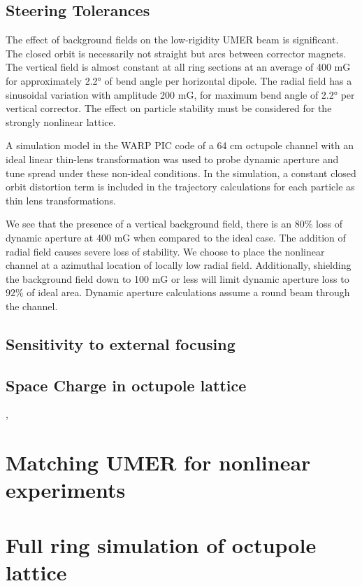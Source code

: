 

\subsection{Steering Tolerances}

The effect of background fields on the low-rigidity UMER beam is significant. The closed orbit is necessarily not straight but arcs between corrector magnets. The vertical field is almost constant at all ring sections at an average of 400 mG for approximately 2.2° of bend angle per horizontal dipole. The radial field has a sinusoidal variation with amplitude 200 mG, for maximum bend angle of 2.2° per vertical corrector. The effect on particle stability must be considered for the strongly nonlinear lattice. 

A simulation model in the WARP PIC code of a 64 cm octupole channel with an ideal linear thin-lens transformation was used to probe dynamic aperture and tune spread under these non-ideal conditions. In the simulation, a constant closed orbit distortion term is included in the trajectory calculations for each particle as thin lens transformations.

We see that the presence of a vertical background field, there is an $80\%$ loss of dynamic aperture at 400 mG when compared to the ideal case. The addition of radial field causes severe loss of stability. We choose to place the nonlinear channel at a azimuthal location of locally low radial field. Additionally, shielding the background field down to 100 mG or less will limit dynamic aperture loss to $92\%$ of ideal area. Dynamic aperture calculations assume a round beam through the channel.

\subsection{Sensitivity to external focusing}

\subsection{Space Charge in octupole lattice}

\cite{Webb2013}, \cite{WebbIPAC2013} %

\section{Matching UMER for nonlinear experiments}


\section{Full ring simulation of octupole lattice}

